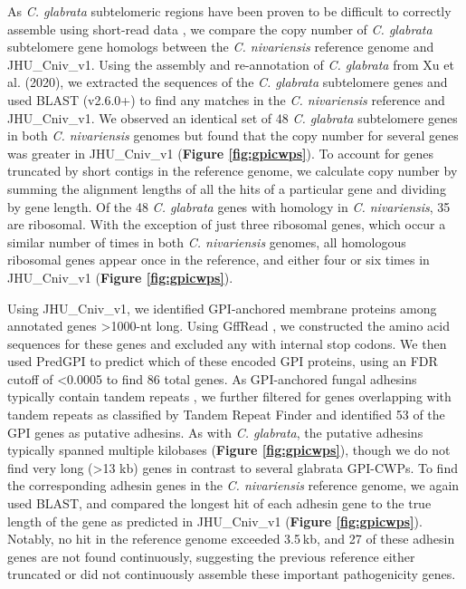 As \textit{C. glabrata} subtelomeric regions have been proven to be difficult to correctly assemble using short-read data \citep{Xu2020-ta}, we compare the copy number of \textit{C. glabrata} subtelomere gene homologs between the \textit{C. nivariensis} reference genome and JHU\_Cniv\_v1. Using the assembly and re-annotation of \textit{C. glabrata} from Xu et al. (2020), we extracted the sequences of the \textit{C. glabrata} subtelomere genes and used BLAST (v2.6.0+) to find any matches in the \textit{C. nivariensis} reference and JHU\_Cniv\_v1. We observed an identical set of 48 \textit{C. glabrata} subtelomere genes in both \textit{C. nivariensis} genomes but found that the copy number for several genes was greater in JHU\_Cniv\_v1 ({\bf Figure \ref{fig:gpicwps}}). To account for genes truncated by short contigs in the reference genome, we calculate copy number by summing the alignment lengths of all the hits of a particular gene and dividing by gene length. Of the 48 \textit{C. glabrata} genes with homology in \textit{C. nivariensis}, 35 are ribosomal. With the exception of just three ribosomal genes, which occur a similar number of times in both \textit{C. nivariensis} genomes, all homologous ribosomal genes appear once in the reference, and either four or six times in JHU\_Cniv\_v1 ({\bf Figure \ref{fig:gpicwps}}).

Using JHU\_Cniv\_v1, we identified GPI-anchored membrane proteins among annotated genes >1000-nt long. Using GffRead \citep{Pertea2020-lw}, we constructed the amino acid sequences for these genes and excluded any with internal stop codons. We then used PredGPI \citep{Pierleoni2008-aw} to predict which of these encoded GPI proteins, using an FDR cutoff of <0.0005 \citep{Xu2020-ta} to find 86 total genes. As GPI-anchored fungal adhesins typically contain tandem repeats \citep{Lipke2018-ow, Xu2020-ta}, we further filtered for genes overlapping with tandem repeats as classified by Tandem Repeat Finder and identified 53 of the GPI genes as putative adhesins. As with \textit{C. glabrata}, the putative adhesins typically spanned multiple kilobases ({\bf Figure \ref{fig:gpicwps}}), though we do not find very long (>13 kb) genes in contrast to several glabrata GPI-CWPs. To find the corresponding adhesin genes in the \textit{C. nivariensis} reference genome, we again used BLAST, and compared the longest hit of each adhesin gene to the true length of the gene as predicted in JHU\_Cniv\_v1 ({\bf Figure \ref{fig:gpicwps}}). Notably, no hit in the reference genome exceeded 3.5 kb, and 27 of these adhesin genes are not found continuously, suggesting the previous reference either truncated or did not continuously assemble these important pathogenicity genes.


